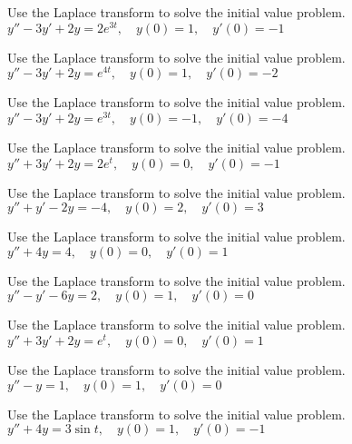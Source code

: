 \documentclass{ximera}
\begin{document}
\begin{problem}\label{exer:8.3.8} Use the Laplace transform to solve the initial value problem. $y''-3y'+2y=2e^{3t}, \quad  y(0)=1,\quad y'(0)=-1$
\end{problem}

\begin{problem}\label{exer:8.3.9} Use the Laplace transform to solve the initial value problem. $y''-3y'+2y=e^{4t}, \quad  y(0)=1,\quad y'(0)=-2$
\end{problem}

\begin{problem}\label{exer:8.3.10} Use the Laplace transform to solve the initial value problem. $y''-3y'+2y=e^{3t}, \quad  y(0)=-1,\quad y'(0)=-4$
\end{problem}

\begin{problem}\label{exer:8.3.11} Use the Laplace transform to solve the initial value problem. $y''+3y'+2y=2e^t, \quad  y(0)=0,\quad y'(0)=-1$
\end{problem}

\begin{problem}\label{exer:8.3.12} Use the Laplace transform to solve the initial value problem. $y''+y'-2y=-4, \quad  y(0)=2,\quad y'(0)=3$
\end{problem}

\begin{problem}\label{exer:8.3.13} Use the Laplace transform to solve the initial value problem. $y''+4y=4, \quad  y(0)=0,\quad y'(0)=1$
\end{problem}

\begin{problem}\label{exer:8.3.14} Use the Laplace transform to solve the initial value problem. $y''-y'-6y=2, \quad  y(0)=1,\quad y'(0)=0$
\end{problem}

\begin{problem}\label{exer:8.3.15} Use the Laplace transform to solve the initial value problem. $y''+3y'+2y=e^t, \quad  y(0)=0,\quad y'(0)=1$
\end{problem}

\begin{problem}\label{exer:8.3.16} Use the Laplace transform to solve the initial value problem. $y''-y=1, \quad  y(0)=1,\quad y'(0)=0$
\end{problem}

\begin{problem}\label{exer:8.3.17} Use the Laplace transform to solve the initial value problem. $y''+4y=3\sin t, \quad  y(0)=1,\quad y'(0)=-1$
\end{problem}
\end{document}
